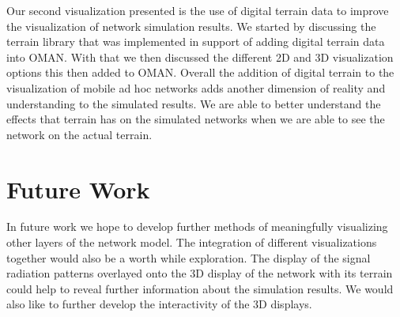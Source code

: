 Our second visualization presented is the use of digital terrain data to improve the visualization of network simulation results.  We started by discussing the terrain library that was implemented in support of adding digital terrain data into OMAN.  With that we then discussed the different 2D and 3D visualization options this then added to OMAN.  Overall the addition of digital terrain to the visualization of mobile ad hoc networks adds another dimension of reality and understanding to the simulated results.  We are able to better understand the effects that terrain has on the simulated networks when we are able to see the network on the actual terrain.

\section{Future Work}
In future work we hope to develop further methods of meaningfully visualizing other layers of the network model.  The integration of different visualizations together would also be a worth while exploration.  The display of the signal radiation patterns overlayed onto the 3D display of the network with its terrain could help to reveal further information about the simulation results.  We would also like to further develop the interactivity of the 3D displays.

